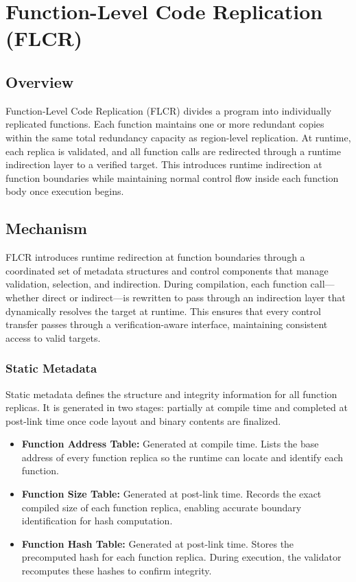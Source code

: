 \chapter{Function-Level Code Replication (FLCR)}
\label{chap:flcr}

\section{Overview}
Function-Level Code Replication (FLCR) divides a program into individually replicated functions.
Each function maintains one or more redundant copies within the same total redundancy capacity
as region-level replication. At runtime, each replica is validated, and all function calls are
redirected through a runtime indirection layer to a verified target.
This introduces runtime indirection at function boundaries while maintaining normal control flow
inside each function body once execution begins.

\section{Mechanism}
FLCR introduces runtime redirection at function boundaries through a coordinated set of metadata
structures and control components that manage validation, selection, and indirection.
During compilation, each function call—whether direct or indirect—is rewritten to pass through
an indirection layer that dynamically resolves the target at runtime.
This ensures that every control transfer passes through a verification-aware interface,
maintaining consistent access to valid targets.

\subsection{Static Metadata}
Static metadata defines the structure and integrity information for all function replicas.
It is generated in two stages: partially at compile time and completed at post-link time once
code layout and binary contents are finalized.

\begin{itemize}
  \item \textbf{Function Address Table:}
        Generated at compile time. Lists the base address of every function replica so the
        runtime can locate and identify each function.
  \item \textbf{Function Size Table:}
        Generated at post-link time. Records the exact compiled size of each function replica,
        enabling accurate boundary identification for hash computation.
  \item \textbf{Function Hash Table:}
        Generated at post-link time. Stores the precomputed hash for each function replica.
        During execution, the validator recomputes these hashes to confirm integrity.
\end{itemize}

